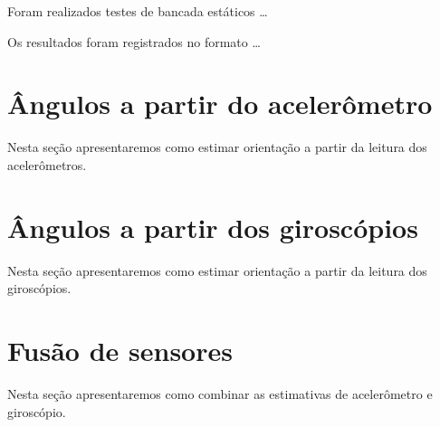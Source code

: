 Foram realizados testes de bancada estáticos \ldots

Os resultados foram registrados no formato \ldots

\section{Ângulos a partir do acelerômetro}

Nesta seção apresentaremos como estimar orientação a partir da leitura dos acelerômetros.

\section{Ângulos a partir dos giroscópios}

Nesta seção apresentaremos como estimar orientação a partir da leitura dos giroscópios.

\section{Fusão de sensores}

Nesta seção apresentaremos como combinar as estimativas de acelerômetro e giroscópio.
